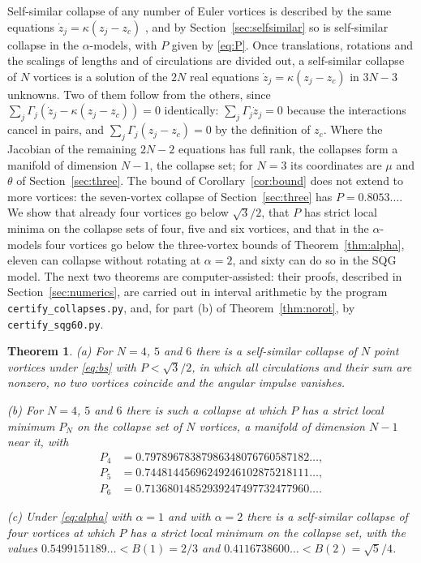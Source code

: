 \documentclass[11pt]{article}
\newtheorem{theorem}{Theorem}
\theoremstyle{definition}
\begin{document}
Self-similar collapse of any number of Euler vortices is described by the same equations $\dot z_j = \kappa(z_j - z_c)$ \cite{dk2014,gotoda2021,kimura1987,oneil1987}, and by Section~\ref{sec:selfsimilar} so is self-similar collapse in the $\alpha$-models, with $P$ given by \eqref{eq:P}. Once translations, rotations and the scalings of lengths and of circulations are divided out, a self-similar collapse of $N$ vortices is a solution of the $2N$ real equations $\dot z_j = \kappa(z_j - z_c)$ in $3N - 3$ unknowns. Two of them follow from the others, since $\sum_j \Gamma_j(\dot z_j - \kappa(z_j - z_c)) = 0$ identically: $\sum_j \Gamma_j\dot z_j = 0$ because the interactions cancel in pairs, and $\sum_j \Gamma_j(z_j - z_c) = 0$ by the definition of $z_c$. Where the Jacobian of the remaining $2N - 2$ equations has full rank, the collapses form a manifold of dimension $N - 1$, the collapse set; for $N = 3$ its coordinates are $\mu$ and $\theta$ of Section~\ref{sec:three}. The bound of Corollary~\ref{cor:bound} does not extend to more vortices: the seven-vortex collapse of Section~\ref{sec:three} has $P = 0.8053\ldots$. We show that already four vortices go below $\sqrt{3}/2$, that $P$ has strict local minima on the collapse sets of four, five and six vortices, and that in the $\alpha$-models four vortices go below the three-vortex bounds of Theorem~\ref{thm:alpha}, eleven can collapse without rotating at $\alpha = 2$, and sixty can do so in the SQG model. The next two theorems are computer-assisted: their proofs, described in Section~\ref{sec:numerics}, are carried out in interval arithmetic by the program \texttt{certify\_\allowbreak collapses.py}, and, for part (b) of Theorem~\ref{thm:norot}, by \texttt{certify\_\allowbreak sqg60.py}.

\begin{theorem}\label{thm:four}
\textup{(a)} For $N = 4$, $5$ and $6$ there is a self-similar collapse of $N$ point vortices under \eqref{eq:bs} with $P < \sqrt{3}/2$, in which all circulations and their sum are nonzero, no two vortices coincide and the angular impulse vanishes.

\textup{(b)} For $N = 4$, $5$ and $6$ there is such a collapse at which $P$ has a strict local minimum $P_N$ on the collapse set of $N$ vortices, a manifold of dimension $N - 1$ near it, with
\begin{align*}
P_4 &= 0.79789678387986348076760587182\ldots,\\
P_5 &= 0.74481445696249246102875218111\ldots,\\
P_6 &= 0.71368014852939247497732477960\ldots.
\end{align*}

\textup{(c)} Under \eqref{eq:alpha} with $\alpha = 1$ and with $\alpha = 2$ there is a self-similar collapse of four vortices at which $P$ has a strict local minimum on the collapse set, with the values $0.5499151189\ldots < B(1) = 2/3$ and $0.4116738600\ldots < B(2) = \sqrt{5}/4$.
\end{theorem}
\end{document}
